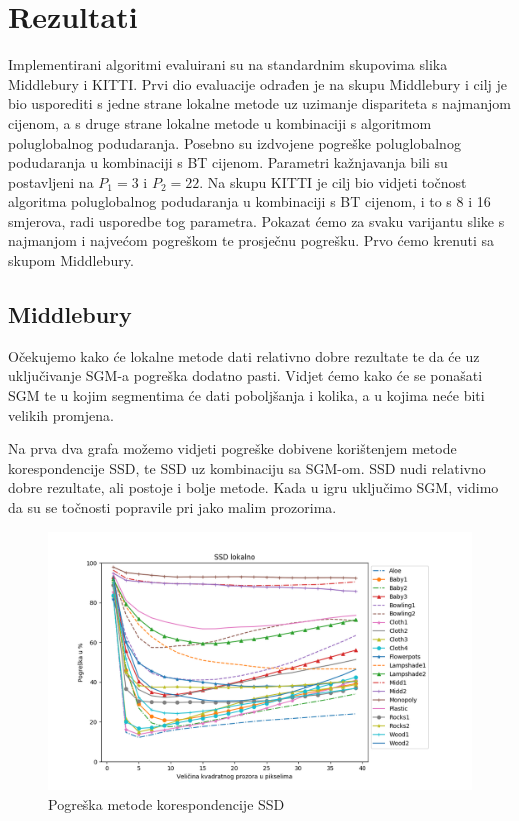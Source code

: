 \documentclass[utf8, zavrsni, numeric]{fer}
\begin{document}
\chapter{Rezultati}

Implementirani algoritmi evaluirani su na standardnim skupovima slika Middlebury i KITTI.
Prvi dio evaluacije odrađen je na skupu Middlebury i cilj je bio usporediti s jedne strane lokalne metode
uz uzimanje dispariteta s najmanjom cijenom, a s druge strane lokalne metode u kombinaciji s
algoritmom poluglobalnog podudaranja. Posebno su izdvojene pogreške poluglobalnog podudaranja
u kombinaciji s BT cijenom. Parametri kažnjavanja bili su postavljeni na $P_1 = 3$ i $P_2 = 22$.
Na skupu KITTI je cilj bio vidjeti točnost algoritma poluglobalnog podudaranja u kombinaciji
s BT cijenom, i to s 8 i 16 smjerova, radi usporedbe tog parametra. Pokazat ćemo za svaku
varijantu slike s najmanjom i najvećom pogreškom te prosječnu pogrešku. Prvo ćemo krenuti sa skupom Middlebury.

\section{Middlebury}

Očekujemo kako će lokalne metode dati relativno dobre rezultate te da će uz uključivanje
SGM-a pogreška dodatno pasti. Vidjet ćemo kako će se ponašati SGM te u kojim segmentima će
dati poboljšanja i kolika, a u kojima neće biti velikih promjena.

Na prva dva grafa možemo vidjeti pogreške dobivene korištenjem metode korespondencije SSD, te
SSD uz kombinaciju sa SGM-om. SSD nudi relativno dobre rezultate, ali postoje i bolje
metode. Kada u igru uključimo SGM, vidimo da su se točnosti popravile pri jako malim
prozorima. 

\begin{figure}[H]
  \centering
  \includegraphics[width=13cm]{img/SSD_lokalno_middlebury.png}
  \caption{Pogreška metode korespondencije SSD}
  \label{fig:SSD-error}
\end{figure}
\end{document}
